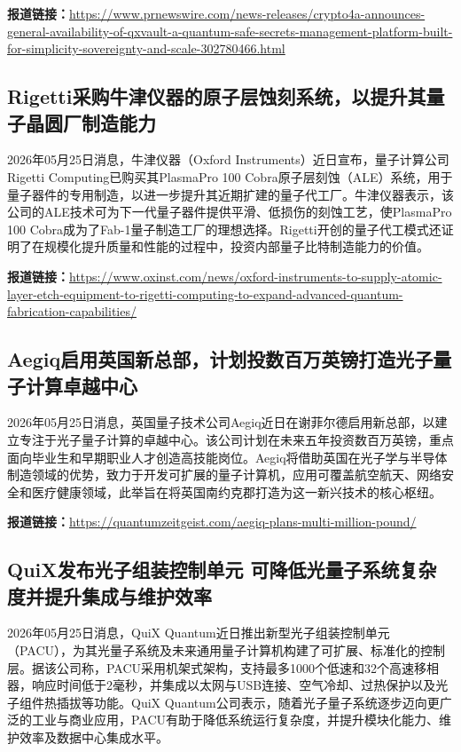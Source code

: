 \documentclass[12pt,a4paper]{ctexart}
\begin{document}
\noindent\textbf{报道链接：}\url{https://www.prnewswire.com/news-releases/crypto4a-announces-general-availability-of-qxvault-a-quantum-safe-secrets-management-platform-built-for-simplicity-sovereignty-and-scale-302780466.html}

\subsection{ Rigetti采购牛津仪器的原子层蚀刻系统，以提升其量子晶圆厂制造能力 }

2026年05月25日消息，牛津仪器（Oxford Instruments）近日宣布，量子计算公司Rigetti Computing已购买其PlasmaPro 100 Cobra原子层刻蚀（ALE）系统，用于量子器件的专用制造，以进一步提升其近期扩建的量子代工厂。牛津仪器表示，该公司的ALE技术可为下一代量子器件提供平滑、低损伤的刻蚀工艺，使PlasmaPro 100 Cobra成为了Fab-1量子制造工厂的理想选择。Rigetti开创的量子代工模式还证明了在规模化提升质量和性能的过程中，投资内部量子比特制造能力的价值。

\noindent\textbf{报道链接：}\url{https://www.oxinst.com/news/oxford-instruments-to-supply-atomic-layer-etch-equipment-to-rigetti-computing-to-expand-advanced-quantum-fabrication-capabilities/}

\subsection{ Aegiq启用英国新总部，计划投数百万英镑打造光子量子计算卓越中心 }

2026年05月25日消息，英国量子技术公司Aegiq近日在谢菲尔德启用新总部，以建立专注于光子量子计算的卓越中心。该公司计划在未来五年投资数百万英镑，重点面向毕业生和早期职业人才创造高技能岗位。Aegiq将借助英国在光子学与半导体制造领域的优势，致力于开发可扩展的量子计算机，应用可覆盖航空航天、网络安全和医疗健康领域，此举旨在将英国南约克郡打造为这一新兴技术的核心枢纽。

\noindent\textbf{报道链接：}\url{https://quantumzeitgeist.com/aegiq-plans-multi-million-pound/}

\subsection{ QuiX发布光子组装控制单元 可降低光量子系统复杂度并提升集成与维护效率 }

2026年05月25日消息，QuiX Quantum近日推出新型光子组装控制单元（PACU），为其光量子系统及未来通用量子计算机构建了可扩展、标准化的控制层。据该公司称，PACU采用机架式架构，支持最多1000个低速和32个高速移相器，响应时间低于2毫秒，并集成以太网与USB连接、空气冷却、过热保护以及光子组件热插拔等功能。QuiX Quantum公司表示，随着光子量子系统逐步迈向更广泛的工业与商业应用，PACU有助于降低系统运行复杂度，并提升模块化能力、维护效率及数据中心集成水平。
\end{document}

